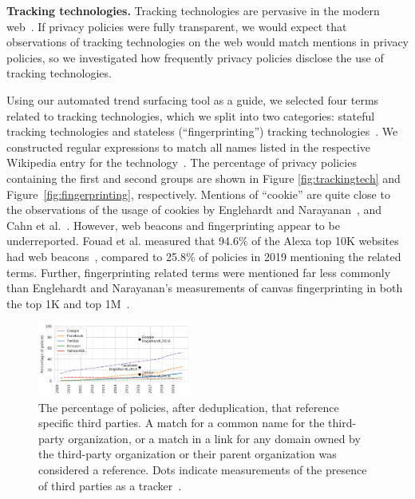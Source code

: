 \textbf{Tracking technologies.} Tracking technologies are pervasive in the modern web~\cite{englehardt2016online}. If privacy policies were fully transparent, we would expect that observations of tracking technologies on the web would match mentions in privacy policies, so we investigated how frequently privacy policies disclose the use of tracking technologies. 

Using our automated trend surfacing tool as a guide, we selected four terms related to tracking technologies, which we split into two categories: stateful tracking technologies and stateless (``fingerprinting'') tracking technologies~\cite{mayer2012}. We constructed regular expressions to match all names listed in the respective Wikipedia entry for the technology~\cite{wikipediaCookie,wikipediaWebBeacon,wikipediaDeviceFingerprint,wikipediaCanvasFingerprint,wikipediaLSO,wikipediaEvercookie}.
The percentage of privacy policies containing the first and second
groups are shown in Figure \ref{fig:trackingtech} and Figure~\ref{fig:fingerprinting}, respectively. Mentions of ``cookie'' are quite close to the observations of the usage of cookies by Englehardt and Narayanan~\cite{englehardt2016online}, and Cahn et al.~\cite{cahn2016empirical}. However, web beacons and fingerprinting appear to be underreported. Fouad et al. measured that 94.6\% of the Alexa top 10K websites had web beacons~\cite{Fouad2020missed}, compared to 25.8\% of policies in 2019 mentioning the related terms. Further, fingerprinting related terms were mentioned far less commonly than Englehardt and Narayanan's measurements of canvas fingerprinting in both the top 1K and top 1M~\cite{englehardt2016online}.

\begin{figure}
    \centering
    \includegraphics[width=0.45\textwidth]{figures/trackers.pdf}
    \caption{The percentage of policies, after deduplication, that reference specific third parties. A match for a common name for the third-party organization, or a match in a link for any domain owned by the third-party organization or their parent organization was considered a reference. Dots indicate measurements of the presence of third parties as a tracker~\cite{englehardt2016online}.}
    \label{fig:trackers}
\end{figure}

